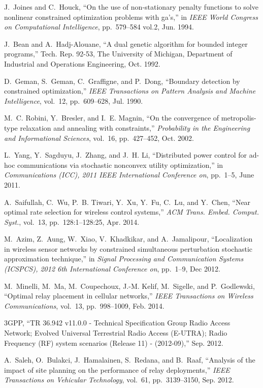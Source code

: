 \documentclass[draftcls,onecolumn]{IEEEtran}
\theoremstyle{plain}
\theoremstyle{definition}
\begin{document}
\begin{thebibliography}{10}
J.~Joines and C.~Houck, ``On the use of non-stationary penalty functions to
  solve nonlinear constrained optimization problems with ga's,'' in {\em IEEE
  World Congress on Computational Intelligence}, pp.~579--584 vol.2, Jun. 1994.

J.~Bean and A.~Hadj-Alouane, ``A dual genetic algorithm for bounded integer
  programs,'' Tech. Rep. 92-53, The University of Michigan, Department of
  Industrial and Operations Engineering, Oct. 1992.

D.~Geman, S.~Geman, C.~Graffigne, and P.~Dong, ``Boundary detection by
  constrained optimization,'' {\em IEEE Transactions on Pattern Analysis and
  Machine Intelligence}, vol.~12, pp.~609--628, Jul. 1990.

M.~C. Robini, Y.~Bresler, and I.~E. Magnin, ``On the convergence of
  metropolis-type relaxation and annealing with constraints,'' {\em Probability
  in the Engineering and Informational Sciences}, vol.~16, pp.~427--452, Oct.
  2002.

L.~Yang, Y.~Sagduyu, J.~Zhang, and J.~H. Li, ``Distributed power control for
  ad-hoc communications via stochastic nonconvex utility optimization,'' in
  {\em Communications (ICC), 2011 IEEE International Conference on}, pp.~1--5,
  June 2011.

A.~Saifullah, C.~Wu, P.~B. Tiwari, Y.~Xu, Y.~Fu, C.~Lu, and Y.~Chen, ``Near
  optimal rate selection for wireless control systems,'' {\em ACM Trans. Embed.
  Comput. Syst.}, vol.~13, pp.~128:1--128:25, Apr. 2014.

M.~Azim, Z.~Aung, W.~Xiao, V.~Khadkikar, and A.~Jamalipour, ``Localization in
  wireless sensor networks by constrained simultaneous perturbation stochastic
  approximation technique,'' in {\em Signal Processing and Communication
  Systems (ICSPCS), 2012 6th International Conference on}, pp.~1--9, Dec 2012.

M.~Minelli, M.~Ma, M.~Coupechoux, J.-M. Kelif, M.~Sigelle, and P.~Godlewski,
  ``Optimal relay placement in cellular networks,'' {\em IEEE Transactions on
  Wireless Communications}, vol.~13, pp.~998--1009, Feb. 2014.

3GPP, ``{TR 36.942 v11.0.0 - Technical Specification Group Radio Access
  Network; Evolved Universal Terrestrial Radio Access (E-UTRA); Radio Frequency
  (RF) system scenarios (Release 11) - (2012-09)},'' Sep. 2012.

A.~Saleh, O.~Bulakci, J.~Hamalainen, S.~Redana, and B.~Raaf, ``Analysis of the
  impact of site planning on the performance of relay deployments,'' {\em IEEE
  Transactions on Vehicular Technology}, vol.~61, pp.~3139--3150, Sep. 2012.

\end{thebibliography}
\end{document}
